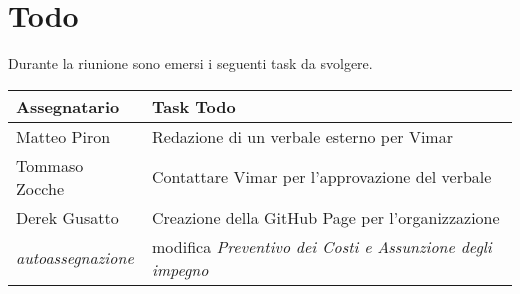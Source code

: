 \section{Todo}
Durante la riunione sono emersi i seguenti task da svolgere.

\begin{center}
  \begin{tabular}{|p{5cm}|p{8cm}|}
    \hline
    \textbf{Assegnatario}       & \textbf{Task Todo} \\ 
    \hline
     Matteo Piron   &  Redazione di un verbale esterno per Vimar  \\ \hline
      Tommaso Zocche   &  Contattare Vimar per l'approvazione del verbale  \\ \hline
     Derek Gusatto   &  Creazione della GitHub Page per l'organizzazione \\ \hline
    \textit{autoassegnazione}   &  modifica  \textit{Preventivo dei Costi e Assunzione degli impegno}\\ \hline
  \end{tabular}
\end{center}